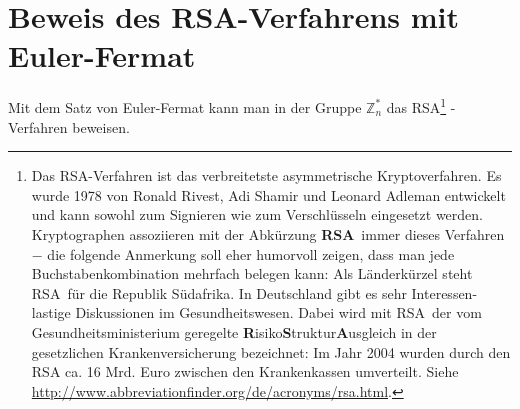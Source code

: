 \begin{refsegment}







\clearpage
\newpage
\hypertarget{RSABeweis}{}
\section{Beweis des RSA-Verfahrens mit Euler-Fermat}
\label{rsabeweis}
Mit dem Satz von Euler-Fermat kann man in der Gruppe $\mathbb{Z}_n^*$ das
RSA\footnote{%
  Das RSA-Verfahren ist das verbreitetste asymmetrische
   Kryptoverfahren. Es wurde 1978 von Ronald
  Rivest, Adi Shamir und Leonard Adleman entwickelt und kann sowohl zum Signieren
  wie zum Verschlüsseln eingesetzt werden.
  Kryptographen assoziieren mit der Abkürzung \glqq \textbf{RSA}\grqq~immer dieses
  Verfahren $-$ die folgende Anmerkung soll eher humorvoll zeigen, dass man
  jede Buchstabenkombination mehrfach belegen kann: Als Länderkürzel steht
  \glqq RSA\grqq~für die Republik Südafrika. In Deutschland gibt es sehr
  Interessen-lastige Diskussionen im Gesundheitswesen. Dabei wird mit
  \glqq RSA\grqq~der vom Gesundheitsministerium geregelte
  \mbox{\glqq\textbf{R}isiko\textbf{S}truktur\textbf{A}usgleich\grqq} in der gesetzlichen
  Krankenversicherung bezeichnet: Im Jahr 2004 wurden durch den RSA ca. 16 Mrd. Euro
  zwischen den Krankenkassen umverteilt. Siehe \url{http://www.abbreviationfinder.org/de/acronyms/rsa.html}.
}%
-Verfahren \glqq beweisen\grqq.



\end{refsegment}
